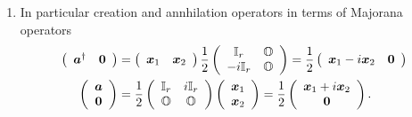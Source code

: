 \documentclass[aps,preprint]{revtex4}%
\newtheorem{lemma}[theorem]{Lemma}
\newenvironment{proof}[1][Proof]{\noindent\textbf{#1.} }{\ \rule{0.5em}{0.5em}}
\begin{document}
\begin{enumerate}
\begin{lemma}
\begin{proof}%
\begin{align*}
\{a_{j}^{\dagger},a_{k}\} &  =\{\frac{1}{2}(x_{j}+ix_{j+r}),\frac{1}{2}%
(x_{k}-ix_{k+r})\}=\frac{1}{4}\left(  \overset{}{(x_{j}+ix_{j+r}%
)(x_{k}-ix_{k+r})+(x_{k}-ix_{k+r})(x_{j}+ix_{j+r})}\right)  \\
&  =\frac{1}{4}\left(  \overset{}{(x_{j})(x_{k}-ix_{k+r})+(ix_{j+r}%
)(x_{k}-ix_{k+r})+(x_{k})(x_{j}+ix_{j+r})}+(-ix_{k+r})(x_{j}+ix_{j+r})\right)
\\
&  =\frac{1}{4}\left(  \overset{}{x_{j}x_{k}-ix_{j}x_{k+r}+ix_{j+r}%
x_{k}+x_{j+r}x_{k+r}+x_{k}x_{j}+ix_{k}x_{j+r}}-ix_{k+r}x_{j}+x_{k+r}%
x_{j+r}\right)  \\
&  =\frac{1}{4}\left(  \overset{}{x_{j}x_{k}+x_{k}x_{j}}+x_{j+r}%
x_{k+r}+x_{k+r}x_{j+r}\right)  \\
&  =\frac{1}{4}\left(  2\delta_{jk}I_{\mathcal{H}_{\mathcal{F}}}+2\delta
_{jk}I_{\mathcal{H}_{\mathcal{F}}}\right)  =\delta_{jk}I_{\mathcal{H}%
_{\mathcal{F}}},\quad1\leq j,k\leq r.\blacksquare
\end{align*}

\end{proof}
\end{lemma}

\item In particular creation and annhilation operators in terms of Majorana
operators
\begin{align}
\left(
\begin{array}
[c]{cc}%
\boldsymbol{a}^{\dagger} & \boldsymbol{0}%
\end{array}
\right)   &  =\left(
\begin{array}
[c]{cc}%
\boldsymbol{x}_{1} & \boldsymbol{x}_{2}%
\end{array}
\right)  \frac{1}{2}\left(
\begin{array}
[c]{cc}%
\mathbb{I}_{r} & \mathbb{O}\\
-i\mathbb{I}_{r} & \mathbb{O}%
\end{array}
\right)  =\frac{1}{2}\left(
\begin{array}
[c]{cc}%
\boldsymbol{x}_{1}-i\boldsymbol{x}_{2} & \boldsymbol{0}%
\end{array}
\right)  \\
\left(
\begin{array}
[c]{c}%
\boldsymbol{a}\\
\boldsymbol{0}%
\end{array}
\right)   &  =\frac{1}{2}\left(
\begin{array}
[c]{cc}%
\mathbb{I}_{r} & i\mathbb{I}_{r}\\
\mathbb{O} & \mathbb{O}%
\end{array}
\right)  \left(
\begin{array}
[c]{c}%
\boldsymbol{x}_{1}\\
\boldsymbol{x}_{2}%
\end{array}
\right)  =\frac{1}{2}\left(
\begin{array}
[c]{c}%
\boldsymbol{x}_{1}+i\boldsymbol{x}_{2}\\
\boldsymbol{0}%
\end{array}
\right)  .
\end{align}



\end{enumerate}
\end{document}
